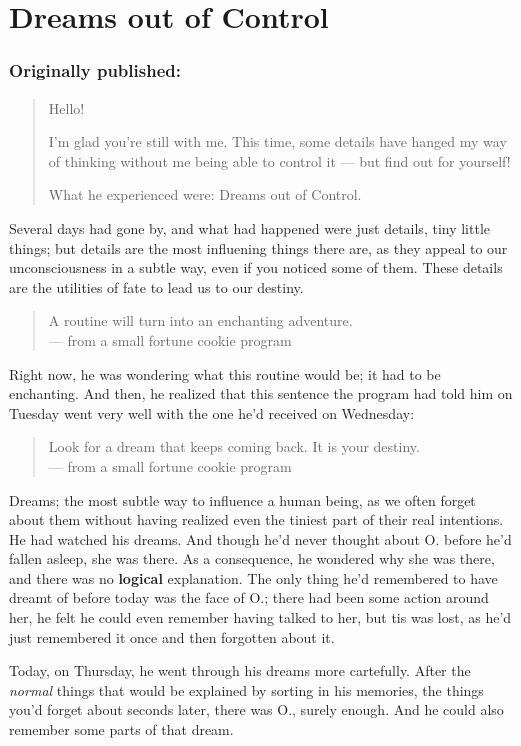 \chapter{Dreams out of Control}
\label{cha:dreams-out-control}
\subsection*{Originally published: }
\begin{quote}
Hello!

I'm glad you're still with me. This time, some details have hanged my way of thinking without me being able to control it --- but find out for yourself!

What he experienced were: Dreams out of Control.
\end{quote}

Several days had gone by, and what had happened were just details, tiny little things; but details are the most influening things there are, as they appeal to our unconsciousness in a subtle way, even if you noticed some of them. These details are the utilities of fate to lead us to our destiny. 
\begin{quote}
A routine will turn into an enchanting adventure. \\
--- from a small fortune cookie program
\end{quote}
Right now, he was wondering what this routine would be; it had to be enchanting. And then, he realized that this sentence the program had told him on Tuesday went very well with the one he'd received on Wednesday: 
\begin{quote}
Look for a dream that keeps coming back. It is your destiny. \\
--- from a small fortune cookie program
\end{quote}
Dreams; the most subtle way to influence a human being, as we often forget about them without having realized even the tiniest part of their real intentions. He had watched his dreams. 
And though he'd never thought about O. before he'd fallen asleep, she was there. As a consequence, he wondered why she was there, and there was no \textbf{logical} explanation. The only thing he'd remembered to have dreamt of before today was the face of O.; there had been some action around her, he felt he could even remember having talked to her, but tis was lost, as he'd just remembered it once and then forgotten about it.

Today, on Thursday, he went through his dreams more cartefully. After the \emph{normal} things that would be explained by sorting in his memories, the things you'd forget about seconds later, there was O., surely enough. And he could also remember some parts of that dream.


